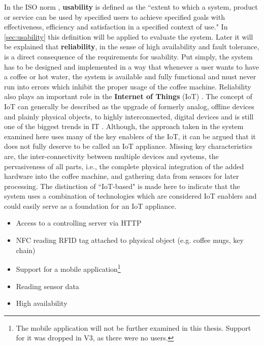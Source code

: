 \documentclass[12pt]{article}
\begin{document}
In the ISO norm \cite{ISO:Usability}, \textbf{usability} is defined as the ``extent to which a system, product or service can be used by specified users to achieve specified goals with effectiveness, efficiency and satisfaction in a specified context of use."
In \autoref{sec:usability} this definition will be applied to evaluate the system.
Later it will be explained that \textbf{reliability}, in the sense of high availability and fault tolerance, is a direct consequence of the requirements for usability.
Put simply, the system has to be designed and implemented in a way that whenever a user wants to have a coffee or hot water,
the system is available and fully functional
and must never run into errors which inhibit the proper usage of the coffee machine.
Reliability also plays an important role in the \textbf{Internet of Things} (IoT) \cite{reliability}.
The concept of IoT can generally be described as the upgrade of formerly analog, offline devices and plainly physical objects, 
to highly interconnected, digital devices and is still one of the biggest trends in IT \cite{review,survey}.
Although, the approach taken in the system examined here uses many of the key enablers of the IoT,
it can be argued that it does not fully deserve to be called an IoT appliance.
Missing key characteristics are, the inter-connectivity between multiple devices and systems,
the pervasiveness of all parts, i.e.,
the complete physical integration of the added hardware into the coffee machine,
and gathering data from sensors for later processing.
The distinction of ``IoT-based" is made here to indicate that the system uses
a combination of technologies which are considered IoT enablers and could easily serve 
as a foundation for an IoT appliance.
\begin{itemize}
  \item Access to a controlling server via HTTP
  \item NFC reading RFID tag attached to physical object (e.g. coffee mugs, key chain)
  \item Support for a mobile application\footnote{The mobile application will not be further examined in this thesis. Support for it was dropped in V3, as there were no users.}
  \item Reading sensor data
  \item High availability
\end{itemize}
\end{document}
